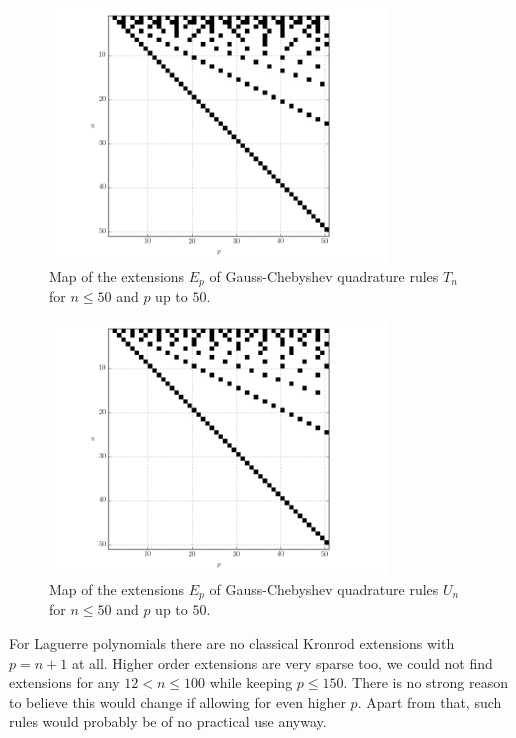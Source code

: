 \documentclass[a4paper,10pt]{article}
\begin{document}
\begin{figure}
  \centering
  \includegraphics[width=0.8\textwidth]{./img/map_chebt_50_50.png}
  \caption{Map of the extensions $E_p$ of Gauss-Chebyshev quadrature rules
           $T_n$ for $n \leq 50$ and $p$ up to $50$.}
  \label{fig:map_chebt_50_50}
\end{figure}

\begin{figure}
  \centering
  \includegraphics[width=0.8\textwidth]{./img/map_chebu_50_50.png}
  \caption{Map of the extensions $E_p$ of Gauss-Chebyshev quadrature rules
           $U_n$ for $n \leq 50$ and $p$ up to $50$.}
  \label{fig:map_leg_100_100}
\end{figure}

For Laguerre polynomials there are no classical Kronrod extensions with $p = n+1$
at all. Higher order extensions are very sparse too, we could not find extensions
for any $12 < n \leq 100$ while keeping $p \leq 150$. There is no strong reason to
believe this would change if allowing for even higher $p$. Apart from that, such
rules would probably be of no practical use anyway.
\end{document}
